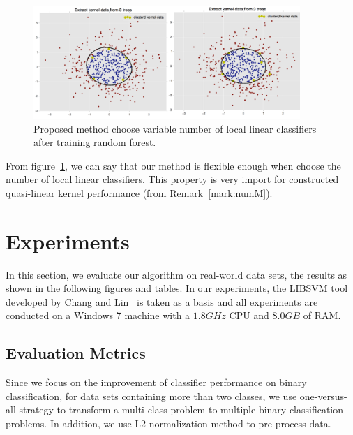 \documentclass[master]{IPSstyle}
\begin{document}
{\begin{figure}[H]
    \centering
    \includegraphics[width=0.9\textwidth]{figures/ch3_cluster_M_number.png}
    \caption{Proposed method choose variable number of local linear classifiers after training random forest.}
    \label{fig:cluster_M_number}
\end{figure}
From figure~\ref{fig:cluster_M_number}, we can say that our method is flexible enough when choose the number of local linear classifiers. This property is very import for constructed quasi-linear kernel performance (from Remark~\ref{mark:numM}).

\chapter{Experiments}

In this section, we evaluate our algorithm on real-world data sets, the results as shown in the following figures and tables. In our experiments, the LIBSVM tool developed by Chang and Lin~\cite{chang2011libsvm} is taken as a basis and all experiments are conducted on a Windows 7 machine with a $1.8GHz$ CPU and $8.0GB$ of RAM.

\section{Evaluation Metrics}
Since we focus on the improvement of classifier performance on binary classification, for data sets containing more than two classes, we use one-versus-all strategy to transform a multi-class problem to multiple binary classification problems. In addition, we use L2 normalization method to pre-process data.

}
\end{document}
